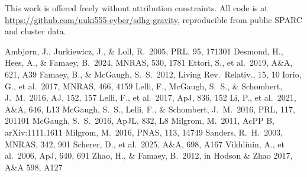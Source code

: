 \documentclass[twocolumn]{aastex631}
\begin{document}
\acknowledgments
This work is offered freely without attribution constraints. All
code is at \url{https://github.com/uuki555-cyber/sdhg-gravity},
reproducible from public SPARC and cluster data.

\begin{thebibliography}{}
 Ambj{\o}rn, J.,
  Jurkiewicz, J., \& Loll, R.\ 2005, PRL, 95, 171301
 Desmond, H., Hees, A., \&
  Famaey, B.\ 2024, MNRAS, 530, 1781
 Ettori, S., et al.\ 2019,
  A\&A, 621, A39
 Famaey, B., \& McGaugh,
  S.\ S.\ 2012, Living Rev.\ Relativ., 15, 10
 Iorio, G., et al.\ 2017,
  MNRAS, 466, 4159
 Lelli, F., McGaugh, S.\ S.,
  \& Schombert, J.\ M.\ 2016, AJ, 152, 157
 Lelli, F., et al.\ 2017,
  ApJ, 836, 152
 Li, P., et al.\ 2021,
  A\&A, 646, L13
 McGaugh, S.\ S., Lelli,
  F., \& Schombert, J.\ M.\ 2016, PRL, 117, 201101
 McGaugh, S.\ S.\ 2016,
  ApJL, 832, L8
 Milgrom, M.\ 2011, AcPP B,
  arXiv:1111.1611
 Milgrom, M.\ 2016, PNAS, 113,
  14749
 Sanders, R.\ H.\ 2003, MNRAS,
  342, 901
 Scherer, D., et al.\
  2025, A\&A, 698, A167
 Vikhlinin, A., et al.\
  2006, ApJ, 640, 691
\bibitem[Zhao \& Famaey(2012)]{ZhaoFamaey2012} Zhao, H., \& Famaey,
  B.\ 2012, in Hodson \& Zhao 2017, A\&A 598, A127
\end{thebibliography}
\end{document}
